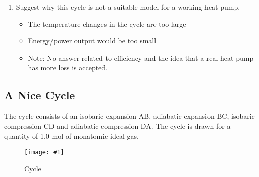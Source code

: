 \documentclass[a4paper,12pt]{article}
\let\oldsi\si
\renewcommand{\si}[1]{\oldsi[per-mode=reciprocal-positive-first]{#1}}
\newcommand{\img}[4]{\begin{center}
  \begin{figure}[H]
    \centering
    \texttt{[image: \#1]}
    \caption{#3}
    \label{fig:#4}
  \end{figure}
\end{center}}
\begin{document}
\begin{enumerate}[label=(\alph*)]
\begin{itemize}
          \item Hence, the total is given by $440 + 375 = 815\si{\joule}$.
        \end{itemize}
  \item Suggest why this cycle is not a suitable model for a working heat pump.
        \begin{itemize}
          \item The temperature changes in the cycle are too large
          \item Energy/power output would be too small
          \item Note: No answer related to efficiency and the idea that a real heat pump has more loss is accepted.
        \end{itemize}
\end{enumerate}

\pagebreak

\subsection{A Nice Cycle}

The cycle consists of an isobaric expansion AB, adiabatic expansion BC, isobaric compression CD and adiabatic compression DA. The cycle is drawn for a quantity of 1.0 mol of monatomic ideal gas.

\img{ex/6.png}{0.8}{Cycle}{ex6}
\end{document}
